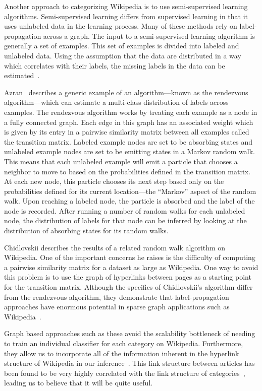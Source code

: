 \documentclass[]{sig-alternate}
\begin{document}
Another approach to categorizing Wikipedia is to use semi-supervised learning algorithms. Semi-supervised learning differs from supervised learning in that it uses unlabeled data in the learning process. Many of these methods rely on label-propagation across a graph. The input to a semi-supervised learning algorithm is generally a set of examples. This set of examples is divided into labeled and unlabeled data. Using the assumption that the data are distributed in a way which correlates with their labels, the missing labels in the data can be estimated~\cite{Carlson}.

Azran~\cite{Azran} describes a generic example of an algorithm---known as the rendezvous algorithm---which can estimate a multi-class distribution of labels across examples. The rendezvous algorithm works by treating each example as a node in a fully connected graph. Each edge in this graph has an associated weight which is given by its entry in a pairwise similarity matrix between all examples called the transition matrix. Labeled example nodes are set to be absorbing states and unlabeled example nodes are set to be emitting states in a Markov random walk.  This means that each unlabeled example will emit a particle that chooses a neighbor to move to based on the probabilities defined in the transition matrix. At each new node, this particle chooses its next step based only on the probabilities defined for its current location---the ``Markov'' aspect of the random walk. Upon reaching a labeled node, the particle is absorbed and the label of the node is recorded. After running a number of random walks for each unlabeled node, the distribution of labels for that node can be inferred by looking at the distribution of absorbing states for its random walks.

Chidlovskii describes the results of a related random walk algorithm on Wikipedia. One of the important concerns he raises is the difficulty of computing a pairwise similarity matrix for a dataset as large as Wikipedia. One way to avoid this problem is to use the graph of hyperlinks between pages as a starting point for the transition matrix. Although the specifics of Chidlovskii's algorithm differ from the rendezvous algorithm, they demonstrate that label-propagation approaches have enormous potential in sparse graph applications such as Wikipedia~\cite{Chidlovskii}.

Graph based approaches such as these avoid the scalability bottleneck of needing to train an individual classifier for each category on Wikipedia. Furthermore, they allow us to incorporate all of the information inherent in the hyperlink structure of Wikipedia in our inference~\cite{Avrachenkov}. This link structure between articles has been found to be very highly correlated with the link structure of categories~\cite{Ponzetto, Holloway}, leading us to believe that it will be quite useful.
\end{document}
